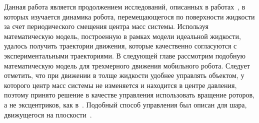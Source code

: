 Данная работа является продолжением исследований, описанных в работах~\cite{Klenov_diss, Klenov_Kilin_2016}, в которых изучается динамика робота, перемещающегося по поверхности жидкости за счет периодического смещения центра масс системы. Используя математическую модель, построенную в рамках модели идеальной жидкости, удалось получить траектории движения, которые качественно согласуются с экспериментальными траекториями. В следующей главе рассмотрим подобную математическую модель для трехмерного движения мобильного робота. Следует отметить, что при движении в толще жидкости удобнее управлять объектом, у которого центр масс системы не изменяется и находится в центре давления, поэтому принято решение в качестве управления использовать вращение роторов, а не эксцентриков, как в~\cite{Klenov_diss, Klenov_Kilin_2016}. Подобный способ управления был описан для шара, движущегося на плоскости~\cite{BKM_Chapligin1, BKM_Chapligin2}.



